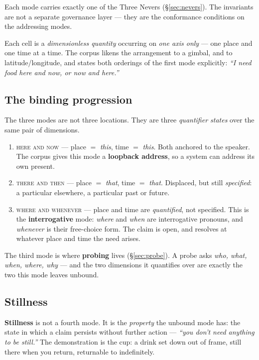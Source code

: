 \documentclass[11pt,a4paper]{article}
\begin{document}
Each mode carries exactly one of the Three Nevers (\S\ref{sec:nevers}). The
invariants are not a separate governance layer --- they are the conformance
conditions on the addressing modes.

Each cell is a \emph{dimensionless quantity} occurring on \emph{one axis only}
--- one place and one time at a time. The corpus likens the arrangement to a
gimbal, and to latitude/longitude, and states both orderings of the first mode
explicitly: \emph{``I need food here and now, or now and here.''}

\subsection{The binding progression}

The three modes are not three locations. They are three \emph{quantifier states}
over the same pair of dimensions.

\begin{enumerate}[leftmargin=*]
  \item \textsc{here and now} --- place $=$ \emph{this}, time $=$ \emph{this}.
    Both anchored to the speaker. The corpus gives this mode a \textbf{loopback
    address}, so a system can address its own present.
  \item \textsc{there and then} --- place $=$ \emph{that}, time $=$ \emph{that}.
    Displaced, but still \emph{specified}: a particular elsewhere, a particular
    past or future.
  \item \textsc{where and whenever} --- place and time are \emph{quantified},
    not specified. This is the \textbf{interrogative} mode: \emph{where} and
    \emph{when} are interrogative pronouns, and \emph{whenever} is their
    free-choice form. The claim is open, and resolves at whatever place and time
    the need arises.
\end{enumerate}

The third mode is where \textbf{probing} lives (\S\ref{sec:probe}). A probe asks
\emph{who, what, when, where, why} --- and the two dimensions it quantifies over
are exactly the two this mode leaves unbound.

\subsection{Stillness}
\label{sec:stillness}

\textbf{Stillness} is not a fourth mode. It is the \emph{property} the unbound
mode has: the state in which a claim persists without further action ---
\emph{``you don't need anything to be still.''} The demonstration is the cup: a
drink set down out of frame, still there when you return, returnable to
indefinitely.
\end{document}
